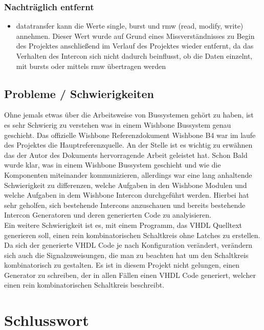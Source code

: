 \documentclass{article}
\begin{document}
\subsubsection{Nachträglich entfernt}
\begin{itemize}
\item datatransfer
kann die Werte single, burst und rmw (read, modify, write) annehmen. Dieser Wert wurde auf Grund eines Missverständnisses zu Begin des Projektes anschließend im Verlauf des Projektes wieder entfernt, da das Verhalten des Intercon sich nicht dadurch beinflusst, ob die Daten einzelnt, mit bursts oder mittels rmw übertragen werden
\end{itemize}
\subsection{Probleme / Schwierigkeiten}
Ohne jemals etwas über die Arbeitsweise von Bussystemen gehört zu haben, ist es sehr Schwierig zu verstehen was in einem Wishbone Bussystem genau geschieht. Das offizielle Wishbone Referenzdokument \glqq Wishbone B4 \grqq war im laufe des Projektes die Hauptreferenzquelle. An der Stelle ist es wichtig zu erwähnen das der Autor des Dokuments hervorragende Arbeit geleistet hat. Schon Bald wurde klar, was in einem Wishbone Bussystem geschieht und wie die Komponenten miteinander kommunizieren, allerdings war eine lang anhaltende Schwierigkeit zu differenzen, welche Aufgaben in den Wishbone Modulen und welche Aufgaben in dem Wishbone Intercon durchgeführt werden. Hierbei hat sehr geholfen, sich bestehende Intercons anzuschauen und bereits bestehende Intercon Generatoren und deren generierten Code zu analyisieren. \\
Ein weitere Schwierigkeit ist es, mit einem Programm, das VHDL Quelltext generieren soll, einen rein kombinatorischen Schaltkreis ohne Latches zu erstellen. Da sich der generierte VHDL Code je nach Konfiguration verändert, verändern sich auch die Signalzuweisungen, die man zu beachten hat um den Schaltkreis kombinatorisch zu gestalten. Es ist in diesem Projekt nicht gelungen, einen Generator zu schreiben, der in allen Fällen einen VHDL Code generiert, welcher einen rein kombinatorischen Schaltkreis beschreibt.
\section{Schlusswort}
\end{document}
